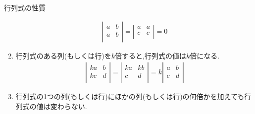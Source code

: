 \documentclass[a4paper]{jsarticle}
\begin{document}
\begin{itembox}[l]{行列式の性質}
\begin{enumerate}[(1)]
\begin{eqnarray*}
                  \left| \begin{array}{rr}
                      a & b \\
                      a & b \\
                  \end{array} \right|
                  =
                  \left| \begin{array}{rr}
                      a & a \\
                      c & c \\
                  \end{array} \right|
                  =0
              \end{eqnarray*}
        \item 行列式のある列(もしくは行)を$k$倍すると,行列式の値は$k$倍になる.
              \begin{eqnarray*}
                  \left| \begin{array}{rr}
                      ka & b \\
                      kc & d \\
                  \end{array} \right|
                  =
                  \left| \begin{array}{rr}
                      ka & kb \\
                      c  & d  \\
                  \end{array} \right|
                  =
                  k
                  \left| \begin{array}{rr}
                      a & b \\
                      c & d \\
                  \end{array} \right|
              \end{eqnarray*}
        \item 行列式の1つの列(もしくは行)にほかの列(もしくは行)の何倍かを加えても行列式の値は変わらない.
    \end{enumerate}
\end{itembox}
\end{document}
